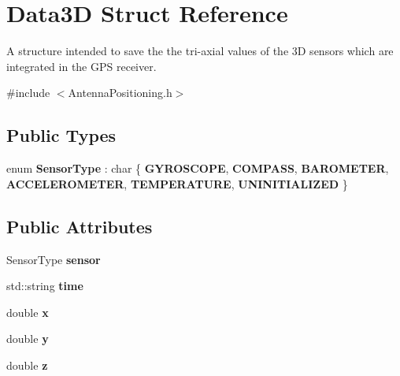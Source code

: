 \hypertarget{structData3D}{}\section{Data3D Struct Reference}
\label{structData3D}


A structure intended to save the the tri-\/axial values of the 3D sensors which are integrated in the G\+PS receiver.  




{\ttfamily \#include $<$Antenna\+Positioning.\+h$>$}

\subsection*{Public Types}
\begin{DoxyCompactItemize}
\item 
\mbox{\label{structData3D_a1b38ab89b23a0b2b309671ac9281a2ac}} 
enum {\bfseries Sensor\+Type} \+: char \{ \newline
{\bfseries G\+Y\+R\+O\+S\+C\+O\+PE}, 
{\bfseries C\+O\+M\+P\+A\+SS}, 
{\bfseries B\+A\+R\+O\+M\+E\+T\+ER}, 
{\bfseries A\+C\+C\+E\+L\+E\+R\+O\+M\+E\+T\+ER}, 
\newline
{\bfseries T\+E\+M\+P\+E\+R\+A\+T\+U\+RE}, 
{\bfseries U\+N\+I\+N\+I\+T\+I\+A\+L\+I\+Z\+ED}
 \}
\end{DoxyCompactItemize}
\subsection*{Public Attributes}
\begin{DoxyCompactItemize}
\item 
\mbox{\label{structData3D_adf9870c0bad9cadb351fc191110549ce}} 
Sensor\+Type {\bfseries sensor}
\item 
\mbox{\label{structData3D_a566d9370452a647cceea530cee5bb62a}} 
std\+::string {\bfseries time}
\item 
\mbox{\label{structData3D_ae8b4e2391802fc2e8b063274e6c0828e}} 
double {\bfseries x}
\item 
\mbox{\label{structData3D_a265d0776c17fba2cc402061b41853ebc}} 
double {\bfseries y}
\item 
\mbox{\label{structData3D_a561037592c0c27d385ddeaeb7a61f864}} 
double {\bfseries z}
\end{DoxyCompactItemize}


